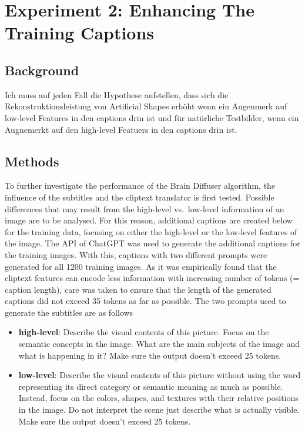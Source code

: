 \section{Experiment 2: Enhancing The Training Captions}

\subsection{Background}

Ich muss auf jeden Fall die Hypothese aufstellen, dass sich die Rekonstruktionsleistung von Artificial Shapes erhöht wenn ein Augenmerk auf low-level Features in den captions drin ist und für natürliche Testbilder, wenn ein Augnemerkt auf den high-level Featuers in den captions drin ist. 

\subsection{Methods}
To further investigate the performance of the Brain Diffuser algorithm, the influence of the subtitles and the cliptext translator is first tested. Possible differences that may result from the high-level vs.\ low-level information of an image are to be analysed. For this reason, additional captions are created below for the training data, focusing on either the high-level or the low-level features of the image. The API of ChatGPT\cite{OpenAI_ChatGPT_2024} was used to generate the additional captions for the training images. With this, captions with two different prompts were generated for all 1200 training images. As it was empirically found that the cliptext features can encode less information with increasing number of tokens (= caption length)\cite{zhangLongCLIPUnlockingLongText2024}, care was taken to ensure that the length of the generated captions did not exceed 35 tokens as far as possible. The two prompts used to generate the subtitles are as follows
\begin{itemize}
    \item \textbf{high-level}: Describe the visual contents of this picture. Focus on the semantic concepts in the image. What are the main subjects of the image and what is happening in it? Make sure the output doesn't exceed 25 tokens.
    \item \textbf{low-level}: Describe the visual contents of this picture without using the word representing its direct category or semantic meaning as much as possible. Instead, focus on the colors, shapes, and textures with their relative positions in the image. Do not interpret the scene just describe what is actually visible. Make sure the output doesn't exceed 25 tokens.
\end{itemize}

